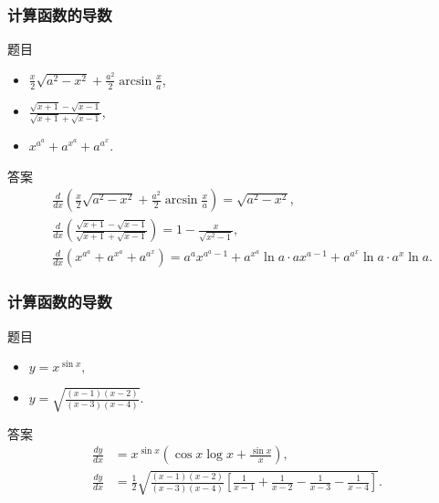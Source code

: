 \documentclass[
10pt,
aspectratio=43,
]{beamer}
\begin{document}
\begin{frame}
	\frametitle{计算函数的导数}

	\begin{block}{题目}
		\begin{itemize}
			\item $\displaystyle\frac{x}{2} \sqrt{a^2-x^2}+\frac{a^2}{2} \arcsin \frac{x}{a}$,
			\item $\displaystyle\frac{\sqrt{x+1}-\sqrt{x-1}}{\sqrt{x+1}+\sqrt{x-1}}$,
			\item $x^{a^a}+a^{x^a}+a^{a^x}$.
		\end{itemize}
	\end{block}

	\pause

	\begin{exampleblock}{答案}
		\begin{align*}
			 & \frac{d}{dx}\left(\frac{x}{2} \sqrt{a^2-x^2}+\frac{a^2}{2} \arcsin \frac{x}{a}\right) = \sqrt{a^2-x^2},                       \\
			 & \frac{d}{dx}\left(\frac{\sqrt{x+1}-\sqrt{x-1}}{\sqrt{x+1}+\sqrt{x-1}}\right) = 1-\frac{x}{\sqrt{x^2-1}},                      \\
			 & \frac{d}{dx}\left(x^{a^a}+a^{x^a}+a^{a^x}\right) = a^a x^{a^a-1}+a^{x^a} \ln a \cdot a x^{a-1}+a^{a^x} \ln a \cdot a^x \ln a.
		\end{align*}
	\end{exampleblock}

\end{frame}

\begin{frame}
	\frametitle{计算函数的导数}

	\begin{block}{题目}
		\begin{itemize}
			\item $y=x^{\sin x},$
			\item $\displaystyle y=\sqrt{\frac{(x-1)(x-2)}{(x-3)(x-4)}}$.
		\end{itemize}
	\end{block}

	\pause

	\begin{exampleblock}{答案}
		\begin{align*}
			\frac{dy}{dx} & = x^{\sin x}\left(\cos x \log x + \frac{\sin x}{x}\right),                                                              \\
			\frac{dy}{dx} & = \frac{1}{2} \sqrt{\frac{(x-1)(x-2)}{(x-3)(x-4)}\left[\frac{1}{x-1}+\frac{1}{x-2}-\frac{1}{x-3}-\frac{1}{x-4}\right]}.
		\end{align*}
	\end{exampleblock}

\end{frame}
\end{document}
